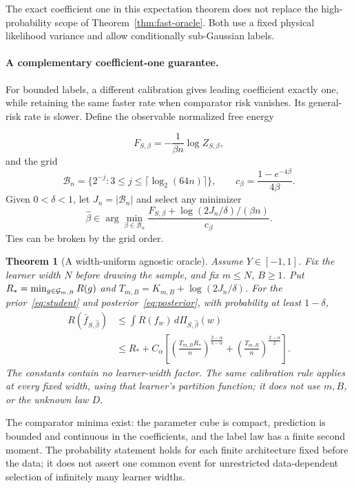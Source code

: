 \documentclass[11pt]{article}
\newtheorem{theorem}{Theorem}[section]\newtheorem{lemma}[theorem]{Lemma}
\theoremstyle{remark}\newtheorem{remark}[theorem]{Remark}
\begin{document}
The exact coefficient one in this expectation theorem does not replace the high-probability scope of Theorem~\ref{thm:fast-oracle}. Both use a fixed physical likelihood variance and allow conditionally sub-Gaussian labels.

\paragraph{A complementary coefficient-one guarantee.}
For bounded labels, a different calibration gives leading coefficient exactly one, while retaining the same faster rate when comparator risk vanishes. Its general-risk rate is slower. Define the observable normalized free energy

\[
 F_{S,\beta}=-\frac1{\beta n}\log Z_{S,\beta},
\]
and the grid
\[
 \mathcal B_n=\{2^{-j}:3\le j\le\lceil\log_2(64n)\rceil\},
 \qquad c_\beta=\frac{1-e^{-4\beta}}{4\beta}.
\]
Given $0<\delta<1$, let $J_n=|\mathcal B_n|$ and select any minimizer
\begin{equation}
 \widehat\beta\in\arg\min_{\beta\in\mathcal B_n}
 \frac{F_{S,\beta}+\log(2J_n/\delta)/(\beta n)}{c_\beta}.
 \label{eq:calibration}
\end{equation}
Ties can be broken by the grid order.

\begin{theorem}[A width-uniform agnostic oracle]\label{thm:oracle}
Assume $Y\in[-1,1]$. Fix the learner width $N$ before drawing the sample, and fix $m\le N$, $B\ge1$. Put $R_* =\min_{g\in\mathcal G_{m,B}}R(g)$ and $T_{m,B}=K_{m,B}+\log(2J_n/\delta)$. For the prior~\eqref{eq:student} and posterior~\eqref{eq:posterior}, with probability at least $1-\delta$,
\begin{align}
 R(\bar f_{S,\widehat\beta})
 &\le\int R(f_w)\,d\Pi_{S,\widehat\beta}(w)\\
 &\le R_*+C_\alpha\left[
 \left(\frac{T_{m,B}R_*}{n}\right)^{\frac{2-\alpha}{4-\alpha}}
 +\left(\frac{T_{m,B}}n\right)^{\frac{2-\alpha}2}
 \right].
 \label{eq:main-oracle}
\end{align}
The constants contain no learner-width factor. The same calibration rule applies at every fixed width, using that learner's partition function; it does not use $m,B$, or the unknown law $D$.
\end{theorem}

The comparator minima exist: the parameter cube is compact, prediction is bounded and continuous in the coefficients, and the label law has a finite second moment. The probability statement holds for each finite architecture fixed before the data; it does not assert one common event for unrestricted data-dependent selection of infinitely many learner widths.
\end{document}
